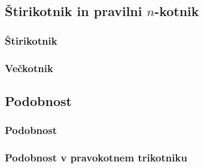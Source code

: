 \begin{frame}
\begin{columns}
\begin{figure}
                            
                    \end{figure}
            \end{columns}
           



        \end{frame}





    \subsection{Štirikotnik in pravilni $n$-kotnik}

        \begin{frame}
            \frametitle{Štirikotnik}
        \end{frame}


        \begin{frame}
            \frametitle{Večkotnik}
        \end{frame}






    \subsection{Podobnost}

        \begin{frame}
            \frametitle{Podobnost}
        \end{frame}

        
        \begin{frame}
            \frametitle{Podobnost v pravokotnem trikotniku}
        \end{frame}

